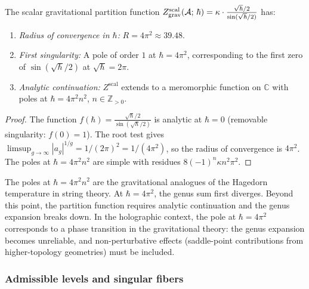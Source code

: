 \begin{proposition}
\label{prop:thqg-I-convergence-radii}
The scalar gravitational partition function $Z^{\mathrm{scal}}_{\mathrm{grav}}(\mathcal{A};\,\hbar) = \kappa \cdot \frac{\sqrt{\hbar}/2}{\sin(\sqrt{\hbar}/2)}$ has:
\begin{enumerate}[label=\textup{(\roman*)}]
\item \emph{Radius of convergence in $\hbar$:} $R = 4\pi^2 \approx 39.48$.
\item \emph{First singularity:} A pole of order $1$ at $\hbar = 4\pi^2$, corresponding to the first zero of $\sin(\sqrt{\hbar}/2)$ at $\sqrt{\hbar} = 2\pi$.
\item \emph{Analytic continuation:} $Z^{\mathrm{scal}}$ extends to a meromorphic function on $\mathbb{C}$ with poles at $\hbar = 4\pi^2 n^2$, $n \in \mathbb{Z}_{> 0}$.
\end{enumerate}
\end{proposition}

\begin{proof}
The function $f(\hbar) = \frac{\sqrt{\hbar}/2}{\sin(\sqrt{\hbar}/2)}$ is analytic at $\hbar = 0$ (removable singularity: $f(0) = 1$). The root test gives $\limsup_{g \to \infty} |a_g|^{1/g} = 1/(2\pi)^2 = 1/(4\pi^2)$, so the radius of convergence is $4\pi^2$. The poles at $\hbar = 4\pi^2 n^2$ are simple with residues $8(-1)^n \kappa n^2\pi^2$.
\end{proof}

\begin{remark}
\label{rem:thqg-I-hagedorn}
The poles at $\hbar = 4\pi^2 n^2$ are the gravitational analogues of the Hagedorn temperature in string theory. At $\hbar = 4\pi^2$, the genus sum first diverges. Beyond this point, the partition function requires analytic continuation and the genus expansion breaks down. In the holographic context, the pole at $\hbar = 4\pi^2$ corresponds to a phase transition in the gravitational theory: the genus expansion becomes unreliable, and non-perturbative effects (saddle-point contributions from higher-topology geometries) must be included.
\end{remark}

\subsubsection{Admissible levels and singular fibers}

